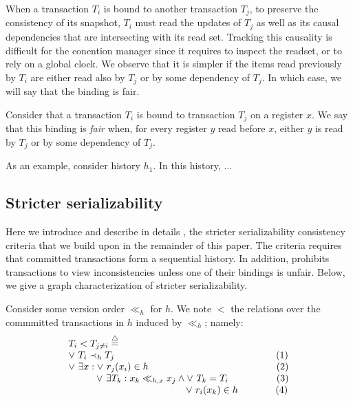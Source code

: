 When a transaction $T_i$ is bound to another transaction $T_j$, to preserve the consistency of its snapshot, $T_i$ must read the updates of $T_j$ as well as its causal dependencies that are intersecting with its read set.
Tracking this causality is difficult for the conention manager since it requires to inspect the readset, or to rely on a global clock.
We observe that it is simpler if the items read previously by $T_i$ are either read also by $T_j$ or by some dependency of $T_j$.
In which case, we will say that the binding is fair.

\begin{definition}
  Consider that a transaction $T_i$ is bound to transaction $T_j$ on a register $x$.
  We say that this binding is \emph{fair} when, for every register $y$ read before $x$, either $y$ is read by $T_j$ or by some dependency of $T_j$.
\end{definition}

As an example, consider history $h_1$.
In this history, ...


\subsection{Stricter serializability}
Here we introduce and describe in details \sser, the stricter serializability consistency criteria that we build upon in the remainder of this paper.
The \sser criteria requires that committed transactions form a sequential history.
In addition, \sser prohibits transactions to view inconsistencies unless one of their bindings is unfair.
Below, we give a graph characterization of stricter serializability.

\begin{definition}
  Consider some version order $\ll_h$ for $h$.
  We note $<$ the relations over the commmitted transactions in $h$ induced by $\ll_h$; namely:
  \begin{displaymath}
    \begin{array}{l}
      T_i < T_{j \neq i}  \equaldef \\
      \lor~ T_i \hb_h T_j {\hspace{16.8em}\text{(1)}} \\
      \lor~ \exists x : \lor~ r_j(x_i) \in h {\hspace{13.3em}\text{(2)}} \\
      \hspace{2.9em}\lor~ \exists T_k : x_k \ll_{h,x} x_j \land \lor~T_k = T_i {\hspace{5em}\text{(3)}} \\
      \hspace{12.2em} \lor~ r_i(x_k) \in h {\hspace{3.9em}\text{(4)}}
    \end{array}
  \end{displaymath}
\end{definition}

